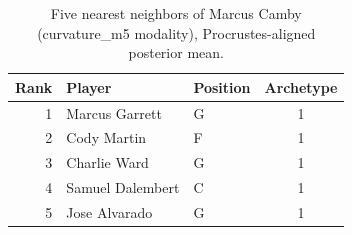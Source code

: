 \begin{table}[htbp]
  \centering\small
  \begin{tabular}{rllc}
    \toprule
    Rank & Player & Position & Archetype \\
    \midrule
    1 & Marcus Garrett & G & 1 \\
    2 & Cody Martin & F & 1 \\
    3 & Charlie Ward & G & 1 \\
    4 & Samuel Dalembert & C & 1 \\
    5 & Jose Alvarado & G & 1 \\
    \bottomrule
  \end{tabular}
  \caption{Five nearest neighbors of Marcus Camby (curvature_m5 modality), Procrustes-aligned posterior mean.}
  \label{tab:Marcus_Camby_neighbors_curvature_m5}
\end{table}

